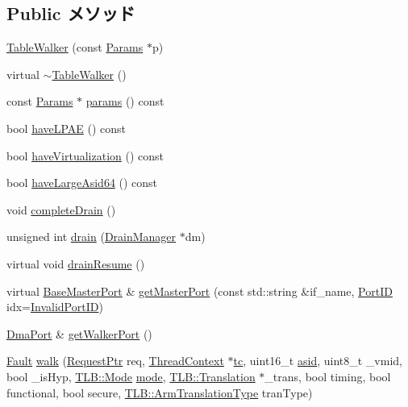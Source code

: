 \subsection*{Public メソッド}
\begin{DoxyCompactItemize}
\item 
\hyperlink{classArmISA_1_1TableWalker_a94df4bedd6f27d12a3573b5169aa0db6}{TableWalker} (const \hyperlink{classArmISA_1_1TableWalker_a422d0236f689cd69d42b3163a521ea15}{Params} $\ast$p)
\item 
virtual \hyperlink{classArmISA_1_1TableWalker_ab934d192b45cb722aa800d73bbb65f41}{$\sim$TableWalker} ()
\item 
const \hyperlink{classArmISA_1_1TableWalker_a422d0236f689cd69d42b3163a521ea15}{Params} $\ast$ \hyperlink{classArmISA_1_1TableWalker_acd3c3feb78ae7a8f88fe0f110a718dff}{params} () const 
\item 
bool \hyperlink{classArmISA_1_1TableWalker_a39b5e5d6cff3c8f5a248143a702d8f1a}{haveLPAE} () const 
\item 
bool \hyperlink{classArmISA_1_1TableWalker_afef641e959fe33dee8702b9bb5e1b9e4}{haveVirtualization} () const 
\item 
bool \hyperlink{classArmISA_1_1TableWalker_a47958664a46869f3fb4f9b043da32be5}{haveLargeAsid64} () const 
\item 
void \hyperlink{classArmISA_1_1TableWalker_a5807f306df98d17f68f466ded6d7799f}{completeDrain} ()
\item 
unsigned int \hyperlink{classArmISA_1_1TableWalker_aa8a18d230dba7a674ac8a0b4f35bc36a}{drain} (\hyperlink{classDrainManager}{DrainManager} $\ast$dm)
\item 
virtual void \hyperlink{classArmISA_1_1TableWalker_a8f020d3237536fe007fc488c4125c5d8}{drainResume} ()
\item 
virtual \hyperlink{classBaseMasterPort}{BaseMasterPort} \& \hyperlink{classArmISA_1_1TableWalker_adc4e675e51defbdd1e354dac729d0703}{getMasterPort} (const std::string \&if\_\-name, \hyperlink{base_2types_8hh_acef4d7d41cb21fdc252e20c04cd7bb8e}{PortID} idx=\hyperlink{base_2types_8hh_a65bf40f138cf863f0c5e2d8ca1144126}{InvalidPortID})
\item 
\hyperlink{classDmaPort}{DmaPort} \& \hyperlink{classArmISA_1_1TableWalker_aab28913130b30d21077d9a054c46b81f}{getWalkerPort} ()
\item 
\hyperlink{classRefCountingPtr}{Fault} \hyperlink{classArmISA_1_1TableWalker_ae5ef435aac9ac661f33937b2254718b1}{walk} (\hyperlink{classRequest}{RequestPtr} req, \hyperlink{classThreadContext}{ThreadContext} $\ast$\hyperlink{namespaceArmISA_a5aff829af55e65b802d83dfcef4e9dd0}{tc}, uint16\_\-t \hyperlink{namespaceArmISA_a92720268bdaf1e0e53fc66152af0ff18}{asid}, uint8\_\-t \_\-vmid, bool \_\-isHyp, \hyperlink{classBaseTLB_a46c8a310cf4c094f8c80e1cb8dc1f911}{TLB::Mode} \hyperlink{namespaceArmISA_a5f3b9b97eb2dfa29d33e74878455f90d}{mode}, \hyperlink{classBaseTLB_1_1Translation}{TLB::Translation} $\ast$\_\-trans, bool timing, bool functional, bool secure, \hyperlink{classArmISA_1_1TLB_ad6f5d480df151d5bddeefc6271793f08}{TLB::ArmTranslationType} tranType)

\end{DoxyCompactItemize}
